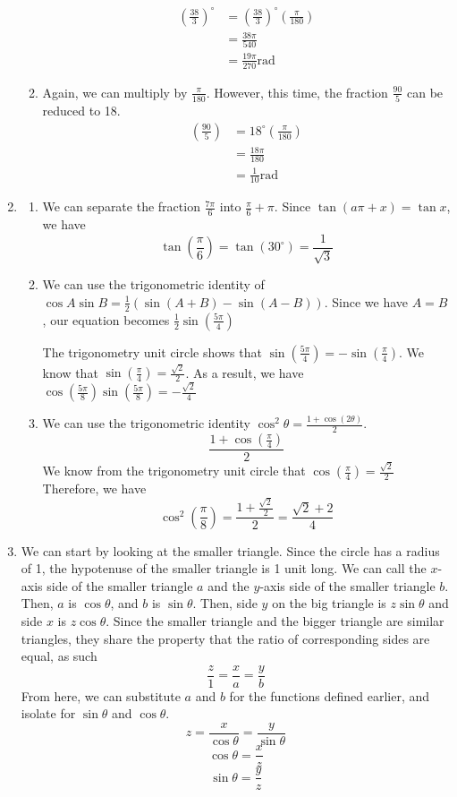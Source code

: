 \documentclass[11pt, letterpaper, twoside, tikz]{article}
\begin{document}
\begin{enumerate}
\begin{enumerate}[label=(\alph*)]
\begin{align*}
\left(\frac{38}{3}\right)^{\circ}&=\left(\frac{38}{3}\right)^{\circ}\left(\frac{\pi}{180}\right)\\
&=\frac{38\pi}{540}\\
&=\boxed{\frac{19\pi}{270}\text{rad}}
\end{align*}

\item Again, we can multiply by $\frac{\pi}{180}$. However, this time, the fraction $\frac{90}{5}$ can be reduced to 18.
\begin{align*}
\left(\frac{90}{5}\right)&=18^{\circ}\left(\frac{\pi}{180}\right)\\
&=\frac{18\pi}{180}\\
&=\boxed{\frac{1}{10}\text{rad}}
\end{align*}
\end{enumerate}
\item \begin{enumerate}[label=(\alph*)]

\item We can separate the fraction $\frac{7\pi}{6}$ into $\frac{\pi}{6}+\pi$. Since $\tan (a\pi+x)=\tan x$, we have
$$\tan \left(\frac{\pi}{6}\right)=\tan(30^{\circ})=\boxed{\frac{1}{\sqrt3}}$$

\item We can use the trigonometric identity of $\cos A \sin B=\frac{1}{2}(\sin (A+B)-\sin(A-B))$. Since we have $A=B$, our equation becomes $\frac{1}{2}\sin (\frac{5\pi}{4})$

The trigonometry unit circle shows that $\sin(\frac{5\pi}{4})=-\sin (\frac{\pi}{4})$. We know that $\sin (\frac{\pi}{4})=\frac{\sqrt2}{2}$. As a result, we have $\cos\left(\frac{5\pi}{8}\right)\sin\left(\frac{5\pi}{8}\right)=\boxed{-\frac{\sqrt2}{4}}$


\item We can use the trigonometric identity $\cos^2\theta=\frac{1+\cos(2\theta)}{2}$.
$$\frac{1+\cos(\frac{\pi}{4})}{2}$$
We know from the trigonometry unit circle that $\cos(\frac{\pi}{4})=\frac{\sqrt2}{2}$
Therefore, we have
$$\cos ^2\left(\frac{\pi}{8}\right)= \frac{1+\frac{\sqrt{2}}{2}}{2}=\boxed{\frac{\sqrt2+2}{4}}$$

\end{enumerate}
\item We can start by looking at the smaller triangle. Since the circle has a radius of 1, the hypotenuse of the smaller triangle is 1 unit long. We can call the $x$-axis side of the smaller triangle $a$ and the $y$-axis side of the smaller triangle $b$. Then, $a$ is $\cos \theta$, and $b$ is $\sin\theta$. Then, side $y$ on the big triangle is $z\sin \theta$ and side $x$ is $z\cos \theta$. Since the smaller triangle and the bigger triangle are similar triangles, they share the property that the ratio of corresponding sides are equal, as such
$$\frac{z}{1}=\frac{x}{a}=\frac{y}{b}$$
From here, we can substitute $a$ and $b$ for the functions defined earlier, and isolate for $\sin \theta$ and $\cos \theta$.
$$z=\frac{x}{\cos \theta}=\frac{y}{\sin \theta}$$
$$\cos \theta=\frac{x}{z} $$
$$\sin \theta=\frac{y}{z} $$


\end{enumerate}
\end{document}
